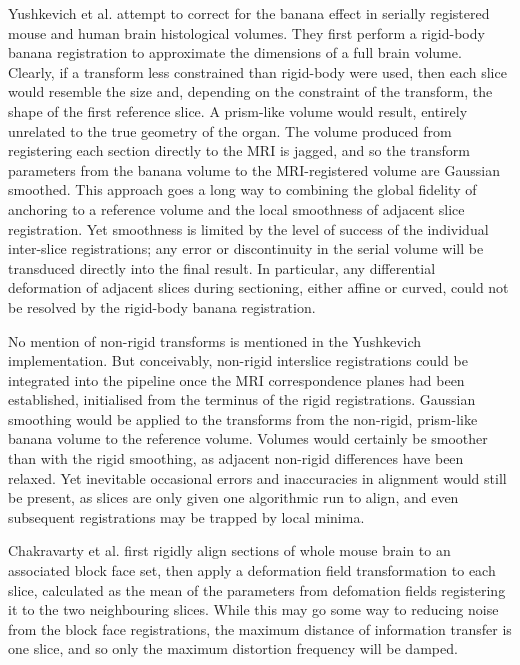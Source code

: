   Yushkevich et al. attempt to correct for the banana effect in serially registered mouse \cite{Yushkevich2006} and human \cite{Adler2012} brain histological volumes. They first perform a rigid-body banana registration to approximate the dimensions of a full brain volume. Clearly, if a transform less constrained than rigid-body were used, then each slice would resemble the size and, depending on the constraint of the transform, the shape of the first reference slice. A prism-like volume would result, entirely unrelated to the true geometry of the organ. The volume produced from registering each section directly to the MRI is jagged, and so the transform parameters from the banana volume to the MRI-registered volume are Gaussian smoothed. This approach goes a long way to combining the global fidelity of anchoring to a reference volume and the local smoothness of adjacent slice registration. Yet smoothness is limited by the level of success of the individual inter-slice registrations; any error or discontinuity in the serial volume will be transduced directly into the final result. In particular, any differential deformation of adjacent slices during sectioning, either affine or curved, could not be resolved by the rigid-body banana registration.
  
  No mention of non-rigid transforms is mentioned in the Yushkevich implementation. But conceivably, non-rigid interslice registrations could be integrated into the pipeline once the MRI correspondence planes had been established, initialised from the terminus of the rigid registrations. Gaussian smoothing would be applied to the transforms from the non-rigid, prism-like banana volume to the reference volume. Volumes would certainly be smoother than with the rigid smoothing, as adjacent non-rigid differences have been relaxed. Yet inevitable occasional errors and inaccuracies in alignment would still be present, as slices are only given one algorithmic run to align, and even subsequent registrations may be trapped by local minima.
  
  Chakravarty et al. \cite{Chakravarty2008} first rigidly align sections of whole mouse brain to an associated block face set, then apply a deformation field transformation to each slice, calculated as the mean of the parameters from defomation fields registering it to the two neighbouring slices. While this may go some way to reducing noise from the block face registrations, the maximum distance of information transfer is one slice, and so only the maximum distortion frequency will be damped.
  
